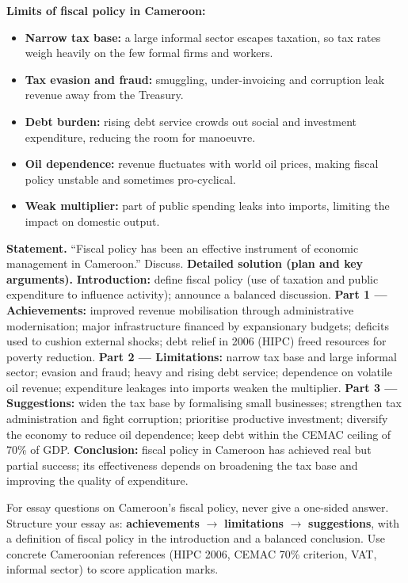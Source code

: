 \documentclass[11pt]{article}
\begin{document}
\textbf{Limits of fiscal policy in Cameroon:}
\begin{itemize}
\item \textbf{Narrow tax base:} a large informal sector escapes taxation, so tax rates weigh heavily on the few formal firms and workers.
\item \textbf{Tax evasion and fraud:} smuggling, under-invoicing and corruption leak revenue away from the Treasury.
\item \textbf{Debt burden:} rising debt service crowds out social and investment expenditure, reducing the room for manoeuvre.
\item \textbf{Oil dependence:} revenue fluctuates with world oil prices, making fiscal policy unstable and sometimes pro-cyclical.
\item \textbf{Weak multiplier:} part of public spending leaks into imports, limiting the impact on domestic output.
\end{itemize}

\begin{exoresolu}
\textbf{Statement.} ``Fiscal policy has been an effective instrument of economic management in Cameroon.'' Discuss.
\tcblower
\textbf{Detailed solution (plan and key arguments).}
\textbf{Introduction:} define fiscal policy (use of taxation and public expenditure to influence activity); announce a balanced discussion.
\textbf{Part 1 --- Achievements:} improved revenue mobilisation through administrative modernisation; major infrastructure financed by expansionary budgets; deficits used to cushion external shocks; debt relief in 2006 (HIPC) freed resources for poverty reduction.
\textbf{Part 2 --- Limitations:} narrow tax base and large informal sector; evasion and fraud; heavy and rising debt service; dependence on volatile oil revenue; expenditure leakages into imports weaken the multiplier.
\textbf{Part 3 --- Suggestions:} widen the tax base by formalising small businesses; strengthen tax administration and fight corruption; prioritise productive investment; diversify the economy to reduce oil dependence; keep debt within the CEMAC ceiling of 70\% of GDP.
\textbf{Conclusion:} fiscal policy in Cameroon has achieved real but partial success; its effectiveness depends on broadening the tax base and improving the quality of expenditure.
\end{exoresolu}

\begin{attention}
For essay questions on Cameroon's fiscal policy, never give a one-sided answer. Structure your essay as: \textbf{achievements} $\rightarrow$ \textbf{limitations} $\rightarrow$ \textbf{suggestions}, with a definition of fiscal policy in the introduction and a balanced conclusion. Use concrete Cameroonian references (HIPC 2006, CEMAC 70\% criterion, VAT, informal sector) to score application marks.
\end{attention}
\end{document}
